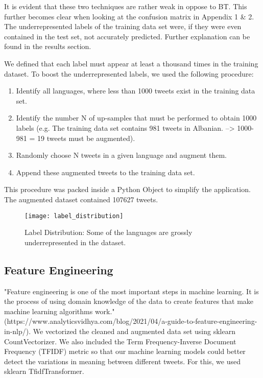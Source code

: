\documentclass[fleqn,10pt]{SelfArx} %
\begin{document}
It is evident that these two techniques are rather weak in oppose to BT. This further becomes clear when looking at the confusion matrix in Appendix 1 \& 2. The underrepresented labels of the training data set were, if they were even contained in the test set, not accurately predicted. Further explanation can be found in the results section. \newline

We defined that each label must appear at least a thousand times in the training dataset. To boost the underrepresented labels, we used the following procedure:
\begin{enumerate}[noitemsep]
	\item Identify all languages, where less than 1000 tweets exist in the training data set.
	\item Identify the number N of up-samples that must be performed to obtain 1000 labels (e.g. The training data set contains 981 tweets in Albanian. --> 1000-981 = 19 tweets must be augmented).
	\item Randomly choose N tweets in a given language and augment them.
	\item Append these augmented tweets to the training data set.
\end{enumerate}
This procedure was packed inside a Python Object to simplify the application. The augmented dataset contained 107627 tweets. 


\begin{figure}[ht]\centering
	\texttt{[image: label\_distribution]}
	\caption{Label Distribution: Some of the languages are grossly underrepresented in the dataset.}
	\label{fig:results}
\end{figure}

\subsection{Feature Engineering}

"Feature engineering is one of the most important steps in machine learning. It is the process of using domain knowledge of the data to create features that make machine learning algorithms work." (https://www.analyticsvidhya.com/blog/2021/04/\newline a-guide-to-feature-engineering-in-nlp/). We vectorized the cleaned and augmented data set using sklearn CountVectorizer. We also included the Term Frequency-Inverse Document Frequency (TFIDF) metric so that our machine learning models could better detect the variations in meaning between different tweets. For this, we used sklearn TfidfTransformer. 
\end{document}
